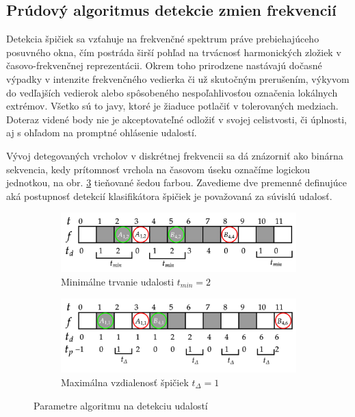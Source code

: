 \subsection{Prúdový algoritmus detekcie zmien frekvencií}
Detekcia špičiek sa vzťahuje na frekvenčné spektrum práve prebiehajúceho posuvného okna, čím postráda širší pohľad na trvácnosť
harmonických zložiek v časovo-frekvenčnej reprezentácii. Okrem toho prirodzene nastávajú dočasné výpadky v intenzite frekvenčného
vedierka či už skutočným prerušením, výkyvom do vedľajších vedierok alebo spôsobeného nespoľahlivosťou označenia lokálnych extrémov.
Všetko sú to javy, ktoré je žiaduce potlačiť v tolerovaných medziach. Doteraz videné body nie je akceptovateľné odložiť v svojej 
celistvosti, či úplnosti, aj s ohľadom na promptné ohlásenie udalostí.

Vývoj detegovaných vrcholov v diskrétnej frekvencii sa dá znázorniť ako binárna sekvencia, kedy prítomnosť vrchola na časovom úseku
označíme logickou jednotkou, na obr. \ref{event-detector} tieňované šedou farbou. Zavedieme dve premenné definujúce aká postupnosť
detekcií klasifikátora špičiek je považovaná za súvislú udalosť.
\begin{figure}[h]
\centering
\begin{subfigure}[b]{0.8\textwidth}
    \centering
    \includegraphics[width=\textwidth]{figures/design/event-detection-min-duration.png}
    \caption{Minimálne trvanie udalosti $t_{min} = 2$}
    \label{event-detector:tmin}
\end{subfigure}
\begin{subfigure}[b]{0.8\textwidth}
    \centering
    \includegraphics[width=\textwidth]{figures/design/event-detection-time-proximity.png}
    \caption{Maximálna vzdialenosť špičiek $t_{\Delta} = 1$}
     \label{event-detector:tdelta}
\end{subfigure}
\caption{Parametre algoritmu na detekciu udalostí}
\label{event-detector}
\end{figure}
